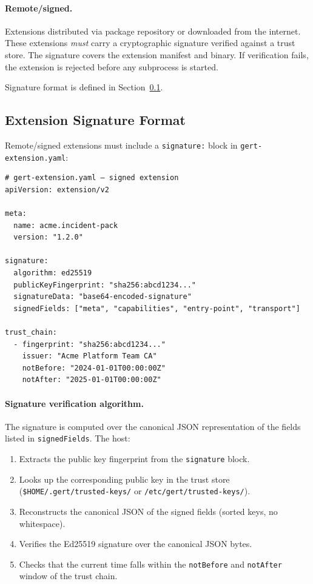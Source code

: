 \paragraph{Remote/signed.}
Extensions distributed via package repository or downloaded from the internet.
These extensions \emph{must} carry a cryptographic signature verified against a
trust store.  The signature covers the extension manifest and binary.  If
verification fails, the extension is rejected before any subprocess is started.

Signature format is defined in Section~\ref{sec:extension-signature}.

\subsection{Extension Signature Format}
\label{sec:extension-signature}

Remote/signed extensions must include a \texttt{signature:} block in
\texttt{gert-extension.yaml}:

\begin{verbatim}
# gert-extension.yaml — signed extension
apiVersion: extension/v2

meta:
  name: acme.incident-pack
  version: "1.2.0"

signature:
  algorithm: ed25519
  publicKeyFingerprint: "sha256:abcd1234..."
  signatureData: "base64-encoded-signature"
  signedFields: ["meta", "capabilities", "entry-point", "transport"]

trust_chain:
  - fingerprint: "sha256:abcd1234..."
    issuer: "Acme Platform Team CA"
    notBefore: "2024-01-01T00:00:00Z"
    notAfter: "2025-01-01T00:00:00Z"
\end{verbatim}

\paragraph{Signature verification algorithm.}
The signature is computed over the canonical JSON representation of the fields
listed in \texttt{signedFields}.  The host:

\begin{enumerate}
  \item Extracts the public key fingerprint from the \texttt{signature} block.
  \item Looks up the corresponding public key in the trust store
        (\texttt{\$HOME/.gert/trusted-keys/} or
        \texttt{/etc/gert/trusted-keys/}).
  \item Reconstructs the canonical JSON of the signed fields (sorted keys,
        no whitespace).
  \item Verifies the Ed25519 signature over the canonical JSON bytes.
  \item Checks that the current time falls within the \texttt{notBefore} and
        \texttt{notAfter} window of the trust chain.
\end{enumerate}

